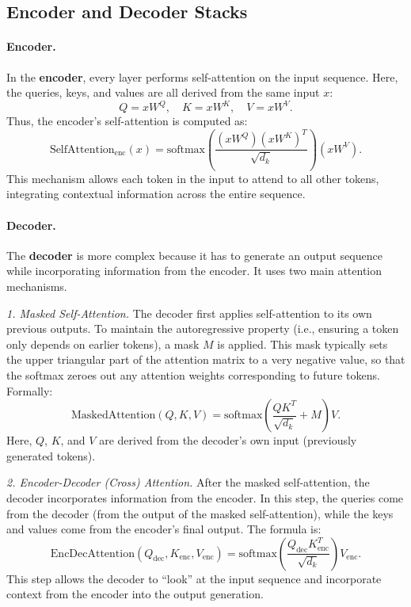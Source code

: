 \documentclass[11pt]{article}
\theoremstyle{remark}
\begin{document}
\subsection{Encoder and Decoder Stacks}

\paragraph{Encoder.}
In the \textbf{encoder}, every layer performs self-attention on the input sequence. Here, the queries, keys, and values are all derived from the same input \( x \):
\[
Q = xW^Q,\quad K = xW^K,\quad V = xW^V.
\]
Thus, the encoder's self-attention is computed as:
\[
\text{SelfAttention}_{\text{enc}}(x) = \text{softmax}\!\left(\frac{(xW^Q)(xW^K)^T}{\sqrt{d_k}}\right)(xW^V).
\]
This mechanism allows each token in the input to attend to all other tokens, integrating contextual information across the entire sequence.

\paragraph{Decoder.}
The \textbf{decoder} is more complex because it has to generate an output sequence while incorporating information from the encoder. It uses two main attention mechanisms.

\emph{1. Masked Self-Attention.}
The decoder first applies self-attention to its own previous outputs. To maintain the autoregressive property (i.e., ensuring a token only depends on earlier tokens), a mask \( M \) is applied. This mask typically sets the upper triangular part of the attention matrix to a very negative value, so that the softmax zeroes out any attention weights corresponding to future tokens. Formally:
\[
\text{MaskedAttention}(Q, K, V) = \text{softmax}\!\left(\frac{QK^T}{\sqrt{d_k}} + M\right)V.
\]
Here, \( Q \), \( K \), and \( V \) are derived from the decoder's own input (previously generated tokens).

\emph{2. Encoder-Decoder (Cross) Attention.}
After the masked self-attention, the decoder incorporates information from the encoder. In this step, the queries come from the decoder (from the output of the masked self-attention), while the keys and values come from the encoder's final output. The formula is:
\[
\text{EncDecAttention}(Q_{\text{dec}}, K_{\text{enc}}, V_{\text{enc}}) = \text{softmax}\!\left(\frac{Q_{\text{dec}} K_{\text{enc}}^T}{\sqrt{d_k}}\right)V_{\text{enc}}.
\]
This step allows the decoder to ``look'' at the input sequence and incorporate context from the encoder into the output generation.
\end{document}
